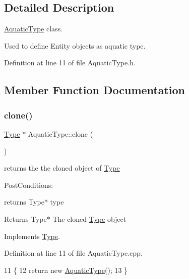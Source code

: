 \subsection{Detailed Description}
\hyperlink{classAquaticType}{Aquatic\+Type} class. 

Used to define Entity objects as aquatic type. 

Definition at line 11 of file Aquatic\+Type.\+h.



\subsection{Member Function Documentation}
\mbox{\label{classAquaticType_afbcc6f679b6108c7ed286ab0aa91bdd5}} 
\subsubsection{\texorpdfstring{clone()}{clone()}}
{\footnotesize\ttfamily \hyperlink{classType}{Type} $\ast$ Aquatic\+Type\+::clone (\begin{DoxyParamCaption}{ }\end{DoxyParamCaption})\hspace{0.3cm}{\ttfamily [virtual]}}



returns the the cloned object of \hyperlink{classType}{Type} 

Post\+Conditions\+:
\begin{DoxyItemize}
\item returns Type$\ast$ type
\end{DoxyItemize}

\begin{DoxyReturn}{Returns}
Type$\ast$ The cloned \hyperlink{classType}{Type} object 
\end{DoxyReturn}


Implements \hyperlink{classType_a7b79d264e2cbac9c091cdb41ffb112c9}{Type}.



Definition at line 11 of file Aquatic\+Type.\+cpp.


\begin{DoxyCode}
11                          \{
12     \textcolor{keywordflow}{return} \textcolor{keyword}{new} \hyperlink{classAquaticType_a2e9287ecb48a58ca5d8fd560da4d9d57}{AquaticType}();
13 \}
\end{DoxyCode}
\mbox{\label{classAquaticType_abb1b9ebdb96a352e0287f7a7cb803eab}} 
